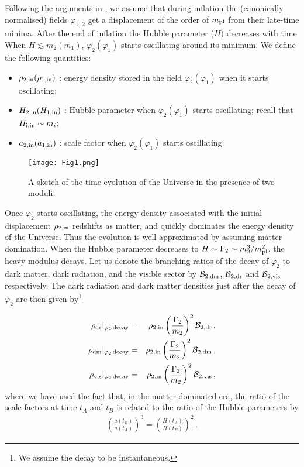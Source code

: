 \documentclass[12pt]{article}
\numberwithin{equation}{section}
\def\bea{\begin{eqnarray}}
\def\eea{\end{eqnarray}}
\begin{document}
Following the arguments in \cite{mismatch}, we assume that during inflation the (canonically normalised) fields 
$\varphi_{1,\, 2}$ get a displacement of the order of $m_{\rm pl}$ from their late-time minima. After the end of inflation the Hubble parameter ($H$)
decreases with time. When $H \lesssim m_2 (m_1)$, $\varphi_2 (\varphi_1)$ starts oscillating around its minimum. 
We define the following quantities:
\begin{itemize}
\item[]  $\rho_{\rm 2,in} (\rho_{\rm 1,in})$ : energy density stored in the field $\varphi_2 (\varphi_1)$ when it starts oscillating;
\item[]  $H_{\rm 2,in} (H_{\rm 1,in})$ : Hubble parameter when $\varphi_2 (\varphi_1)$ starts oscillating; recall that $H_{\rm i,in} \sim m_i$;
\item[]  $a_{\rm 2,in} (a_{\rm 1,in})$ : scale factor when $\varphi_2 (\varphi_1)$ starts oscillating.
\end{itemize}
%
\begin{figure}[!h!]
\centering
\texttt{[image: Fig1.png]}
\caption{A sketch of the time evolution of the Universe in the presence of two moduli.}
\end{figure}
%
Once $\varphi_2$ starts oscillating, the energy density associated with the initial displacement $\rho_{\rm 2, in}$ redshifts as matter, and quickly
dominates the energy density of the Universe. Thus the evolution is well approximated by assuming matter domination. 
When the Hubble parameter decreases to $H \sim \Gamma_2 \sim m_2^3/m_{\rm pl}^2$, the heavy modulus decays. Let us denote the
branching ratios of the decay of $\varphi_2$ to
dark matter, dark radiation, and the visible sector by ${\cal B}_{\rm 2,dm}$, ${\cal B}_{\rm 2,dr}$ and ${\cal B}_{\rm 2,vis}$ respectively. 
 The dark radiation and dark matter densities just after the decay of $\varphi_2$ are then given by\footnote{We assume the decay to be instantaneous.}
 
 \bea
\label{dr22}
\rho_{\rm dr}|_ {\varphi_2 \, {\rm decay}} &=& \rho_{2, {\rm in} } \left( \frac{\Gamma_2}{m_2} \right)^2  {\cal B}_{\rm 2,dr} \,, \\ 
\label{dm22-old}
\rho_{\rm dm}|_ {\varphi_2 \, {\rm decay}} &=& \rho_{2, {\rm in} } \left( \frac{\Gamma_2}{m_2} \right)^2  {\cal B}_{\rm 2,dm} \,, \\
\label{vis22}
\rho_{\rm vis}|_ {\varphi_2 \, {\rm decay}} &=& \rho_{2, {\rm in} } \left( \frac{\Gamma_2}{m_2} \right)^2  {\cal B}_{\rm 2,vis} \,,
\eea
where we have used the fact that, in the matter dominated era, the ratio of the scale factors at time $t_{A}$ and $t_{B}$ is related to the ratio
of the Hubble parameters  by
%
\bea
\left( \frac{a(t_B)}{a(t_A)} \right)^3 = \left( \frac{H(t_A)}{H(t_B)} \right)^2 \, .  
\eea
%
\end{document}

